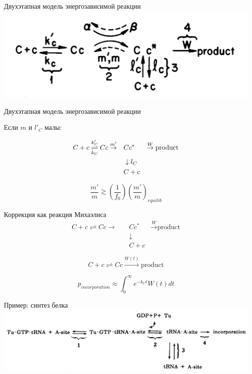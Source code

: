 \documentclass{beamer}
\begin{document}
\begin{frame}{Двухэтапная модель энергозависимой реакции}
    \centering \includegraphics[width=\textwidth]{reaction8}
\end{frame}

\begin{frame}{Двухэтапная модель энергозависимой реакции} %

Если $ m $ и $ l'_C $ малы:

\begin{align*}
    C + c \overunderset{k'_C}{k_C}{\rightleftharpoons} Cc \overset{m'}{\rightarrow} \quad & Cc^* & \overset{W}\to \text{product} \\
    & \downarrow l_C & \\
    & C+c &
\end{align*}

\[ \frac{m'}{m} \gtrsim \left( \frac{1}{f_0} \right) \left( \frac{m'}{m} \right)_{equilib} \]

\end{frame}

\begin{frame}{Коррекция как реакция Михаэлиса}
	\begin{align*}
		C + c \rightleftharpoons Cc \rightarrow \quad & Cc^* & \overset{W}\to \text{product} \\
		& \downarrow & \\
		& C+c &
	\end{align*}

	
	\[ C + c \rightleftharpoons Cc \overset{W(t)}\to \text{product} \]
	
	\[ p_{incorporation} \approx \int_{0}^{\infty} e^{-k_C t} W(t) dt \]
\end{frame}

\begin{frame}{Пример: синтез белка }
\centering \includegraphics[width=\textwidth]{reaction_rna2protein}

\end{frame}
\end{document}
